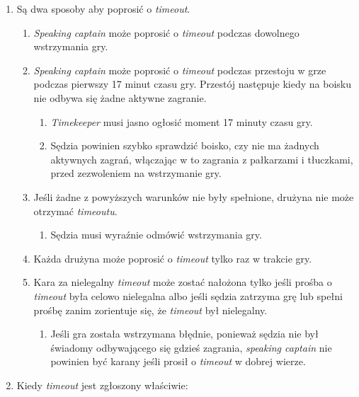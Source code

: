 \documentclass[11pt,a4paper]{article}
\begin{document}
\begin{enumerate}

\item
  Są dwa sposoby aby poprosić o \emph{timeout}.

  \begin{enumerate}
  
  \item
    \emph{Speaking captain} może poprosić o \emph{timeout} podczas
    dowolnego wstrzymania gry.
  \item
    \emph{Speaking captain} może poprosić o \emph{timeout} podczas
    przestoju w grze podczas pierwszy 17 minut czasu gry. Przestój
    następuje kiedy na boisku nie odbywa się żadne aktywne zagranie.

    \begin{enumerate}
    
    \item
      \emph{Timekeeper} musi jasno ogłosić moment 17 minuty czasu gry.
    \item
      Sędzia powinien szybko sprawdzić boisko, czy nie ma żadnych
      aktywnych zagrań, włączając w to zagrania z pałkarzami i
      tłuczkami, przed zezwoleniem na wstrzymanie gry.
    \end{enumerate}
  \item
    Jeśli żadne z powyższych warunków nie były spełnione, drużyna nie
    może otrzymać \emph{timeoutu}.

    \begin{enumerate}
    
    \item
      Sędzia musi wyraźnie odmówić wstrzymania gry.
    \end{enumerate}
  \item
    Każda drużyna może poprosić o \emph{timeout} tylko raz w trakcie
    gry.
  \item
    Kara za nielegalny \emph{timeout} może zostać nałożona tylko jeśli
    prośba o \emph{timeout} była celowo nielegalna albo jeśli sędzia
    zatrzyma grę lub spełni prośbę zanim zorientuje się, że
    \emph{timeout} był nielegalny.

    \begin{enumerate}
    
    \item
      Jeśli gra została wstrzymana błędnie, ponieważ sędzia nie był
      świadomy odbywającego się gdzieś zagrania, \emph{speaking captain}
      nie powinien być karany jeśli prosił o \emph{timeout} w dobrej
      wierze.
    \end{enumerate}
  \end{enumerate}
\item
  Kiedy \emph{timeout} jest zgłoszony właściwie:


\end{enumerate}
\end{document}
